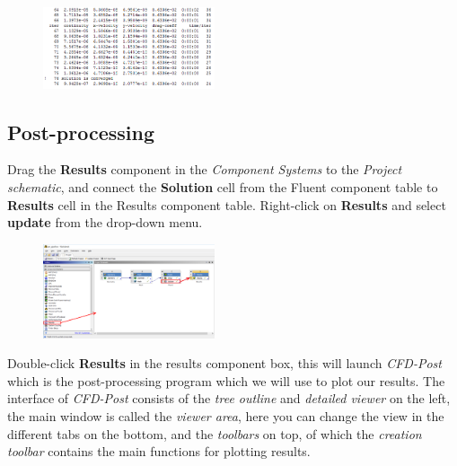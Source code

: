 \documentclass[11pt,a4paper,oneside]{scrartcl}
\newcommand\bfr[1]{\textcolor[rgb]{1,0.00,0.00}{\textbf{\textsf{#1}}}}
\begin{document}
\begin{figure}[H]
\begin{center}
\includegraphics[width=0.45\textwidth,clip]{residuals_console.png}
\end{center}
\end{figure}

\subsection{Post-processing}
Drag the \bfr{Results} component in the \emph{Component Systems} to the \emph{Project schematic}, and connect the \bfr{Solution} cell from the Fluent component table to \bfr{Results} cell in the Results component table. Right-click on \bfr{Results} and select \bfr{update} from the drop-down menu.

\begin{figure}[H]
\begin{center}
\includegraphics[width=0.45\textwidth,clip]{results_workbench.png}
\end{center}
\end{figure}

Double-click \bfr{Results} in the results component box, this will launch \emph{CFD-Post} which is the post-processing program which  we will use to plot our results. The interface of \emph{CFD-Post} consists of the \emph{tree outline} and \emph{detailed viewer} on the left, the main window is called the \emph{viewer area}, here you can change the view in the different tabs on the bottom, and the \emph{toolbars} on top, of which the \emph{creation toolbar} contains the main functions for plotting results.
\end{document}
